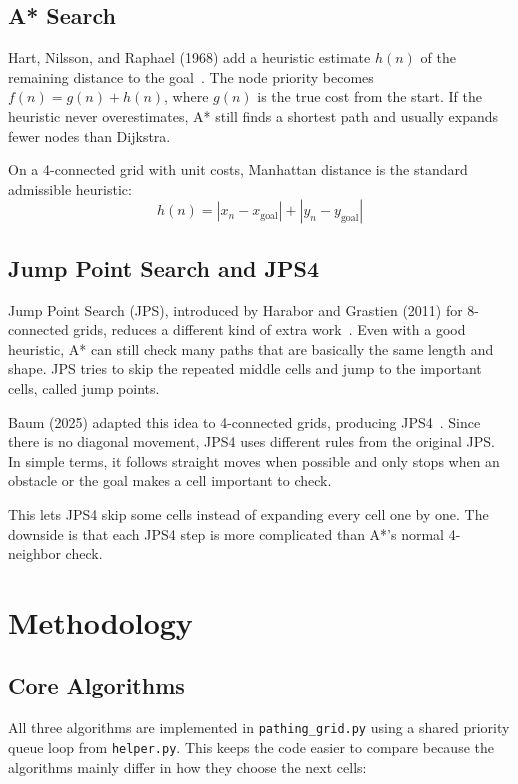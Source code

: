 \documentclass[11pt,a4paper]{article}
\begin{document}
\subsection{A* Search}

Hart, Nilsson, and Raphael (1968) add a heuristic estimate $h(n)$ of the remaining distance to the goal~\cite{hart1968}. The node priority becomes $f(n) = g(n) + h(n)$, where $g(n)$ is the true cost from the start. If the heuristic never overestimates, A* still finds a shortest path and usually expands fewer nodes than Dijkstra.

On a 4-connected grid with unit costs, Manhattan distance is the standard admissible heuristic:
\[
  h(n) = |x_n - x_{\text{goal}}| + |y_n - y_{\text{goal}}|
\]

\subsection{Jump Point Search and JPS4}

Jump Point Search (JPS), introduced by Harabor and Grastien (2011) for 8-connected grids, reduces a different kind of extra work~\cite{harabor2011}. Even with a good heuristic, A* can still check many paths that are basically the same length and shape. JPS tries to skip the repeated middle cells and jump to the important cells, called jump points.

Baum (2025) adapted this idea to 4-connected grids, producing JPS4~\cite{baum2025}. Since there is no diagonal movement, JPS4 uses different rules from the original JPS. In simple terms, it follows straight moves when possible and only stops when an obstacle or the goal makes a cell important to check.

This lets JPS4 skip some cells instead of expanding every cell one by one. The downside is that each JPS4 step is more complicated than A*'s normal 4-neighbor check.

\section{Methodology}

\subsection{Core Algorithms}

All three algorithms are implemented in \texttt{pathing\_grid.py} using a shared priority queue loop from \texttt{helper.py}. This keeps the code easier to compare because the algorithms mainly differ in how they choose the next cells:
\end{document}
